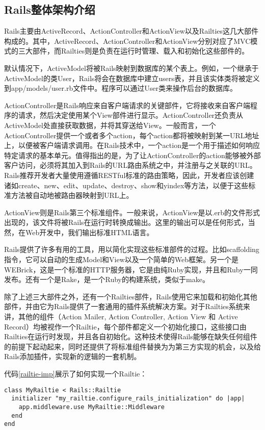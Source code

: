 \subsection{Rails整体架构介绍}
Rails主要由ActiveRecord、ActionController和ActionView以及Railties这几大部件构成的。其中，ActiveRecord、ActionController和ActionView分别对应了MVC模式的三大部件，而Railties则是负责在运行时管理、载入和初始化这些部件的。

默认情况下，ActiveModel将被Rails映射到数据库的某个表上。例如，一个继承于ActiveModel的类User，Rails将会在数据库中建立users表，并且该实体类将被定义到app/models/user.rb文件中。程序可以通过User类来操作后台的数据库。

ActionController是Rails响应来自客户端请求的关键部件，它将接收来自客户端程序的请求，然后决定使用某个View部件进行显示。ActionController还负责从ActiveModel处直接获取数据，并将其穿送给View。一般而言，一个ActionController提供一个或者多个action，每个action都将被映射到某一URL地址上，以便被客户端请求调用。在Rails技术中，一个action是一个用于描述如何响应特定请求的基本单元。值得指出的是，为了让ActionController的action能够被外部客户访问，必须将其加入到Rails的URL路由系统之中，并注册与之关联的URL。Rails推荐开发者大量使用遵循RESTful标准的路由策略，因此，开发者应该创建诸如create、new、edit、update、destroy、show和yindex等方法，以便于这些标准方法被自动地被路由器映射到URL上。

ActionView则是Rails第三个标准组件。一般来说，ActionView是以.erb的文件形式出现的，该文件将被Rails在运行时转换成输出。这里的输出可以是任何形式，当然，在Web开发中，我们输出标准HTML语言。

Rails提供了许多有用的工具，用以简化实现这些标准部件的过程。比如scaffolding指令，它可以自动的生成Model和View以及一个简单的Web框架。另一个是WEBrick，这是一个标准的HTTP服务器，它是由纯Ruby实现，并且和Ruby一同发布。还有一个是Rake，是一个Ruby的构建系统，类似于make。

除了上述三大部件之外，还有一个Railties部件，Rails使用它来加载和初始化其他部件，并由它为Rails提供了一套通用的插件系统解决方案。对于Railties系统来讲，其他的组件（Action Mailer, Action Controller, Action View 和 Active Record）均被视作一个Railtie，每个部件都定义一个初始化接口，这些接口由Railties在运行时发现，并且各自初始化。这种技术使得Rails能够在缺失任何组件的前提下起动起来，同时还提供了将标准组件替换为为第三方实现的机会，以及给Rails添加插件，实现新的逻辑的一套机制。

代码\ref{railtie-imp}展示了如何实现一个Railtie：

\begin{lstlisting}[caption={一个简单的Railtie实现}, label={railtie-imp}]
class MyRailtie < Rails::Railtie
  initializer "my_railtie.configure_rails_initialization" do |app|
    app.middleware.use MyRailtie::Middleware
  end
end
\end{lstlisting}

